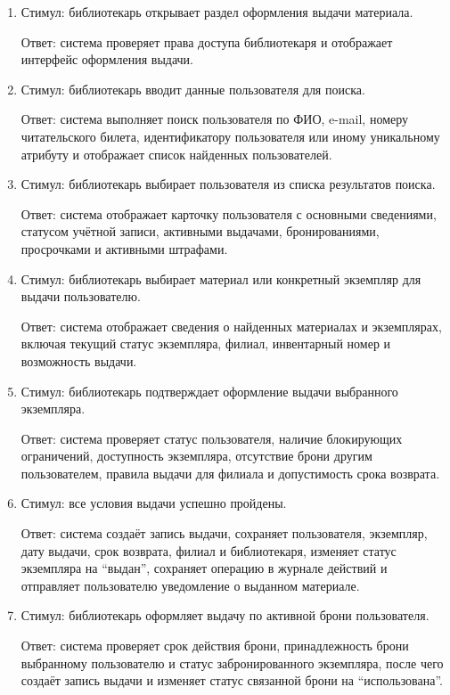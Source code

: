 \documentclass[12pt,a4paper]{article}
\begin{document}
	\begin{enumerate}
		\item Стимул: библиотекарь открывает раздел оформления выдачи материала.
		
		Ответ: система проверяет права доступа библиотекаря и отображает интерфейс
		оформления выдачи.
		
		\item Стимул: библиотекарь вводит данные пользователя для поиска.
		
		Ответ: система выполняет поиск пользователя по ФИО, e-mail, номеру
		читательского билета, идентификатору пользователя или иному уникальному
		атрибуту и отображает список найденных пользователей.
		
		\item Стимул: библиотекарь выбирает пользователя из списка результатов поиска.
		
		Ответ: система отображает карточку пользователя с основными сведениями,
		статусом учётной записи, активными выдачами, бронированиями, просрочками
		и активными штрафами.
		
		\item Стимул: библиотекарь выбирает материал или конкретный экземпляр для
		выдачи пользователю.
		
		Ответ: система отображает сведения о найденных материалах и экземплярах,
		включая текущий статус экземпляра, филиал, инвентарный номер и возможность
		выдачи.
		
		\item Стимул: библиотекарь подтверждает оформление выдачи выбранного экземпляра.
		
		Ответ: система проверяет статус пользователя, наличие блокирующих ограничений,
		доступность экземпляра, отсутствие брони другим пользователем, правила выдачи
		для филиала и допустимость срока возврата.
		
		\item Стимул: все условия выдачи успешно пройдены.
		
		Ответ: система создаёт запись выдачи, сохраняет пользователя, экземпляр,
		дату выдачи, срок возврата, филиал и библиотекаря, изменяет статус экземпляра
		на ``выдан'', сохраняет операцию в журнале действий и отправляет пользователю
		уведомление о выданном материале.
		
		\item Стимул: библиотекарь оформляет выдачу по активной брони пользователя.
		
		Ответ: система проверяет срок действия брони, принадлежность брони выбранному
		пользователю и статус забронированного экземпляра, после чего создаёт запись
		выдачи и изменяет статус связанной брони на ``использована''.
		

\end{enumerate}
\end{document}
